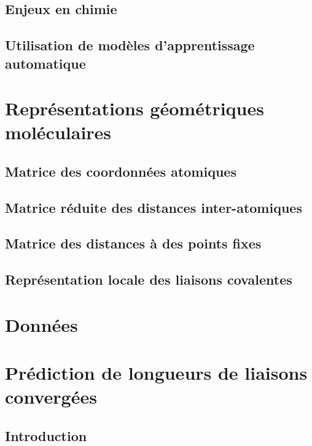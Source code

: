 \documentclass{report}
\begin{document}
	\section{Enjeux en chimie}
		
	\section{Utilisation de modèles d'apprentissage automatique}
		
		
\chapter{Représentations géométriques moléculaires}
	\section{Matrice des coordonnées atomiques}
		

	\section{Matrice réduite des distances inter-atomiques}
		
		
	\section{Matrice des distances à des points fixes}
		
		
	\section{Représentation locale des liaisons covalentes}
		

\chapter{Données}
	

\chapter{Prédiction de longueurs de liaisons convergées}
	\section{Introduction}
		
\end{document}
